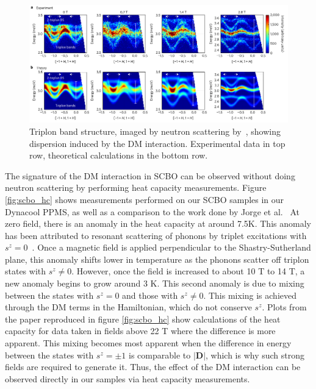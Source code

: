 \documentclass{thesis-umich}
\begin{document}
\begin{figure}
	\centering
	\caption[Triplon Bands in SCBO]{Triplon band structure, imaged by neutron scattering by~\cite{McClarty2017}, showing dispersion induced by the DM interaction. Experimental data in top row, theoretical calculations in the bottom row.}
	\label{fig:scbo_triplon_bands}
	\includegraphics[width=\columnwidth]{figures/SCBO_triplon_bands_McClarty.pdf}
\end{figure}

The signature of the DM interaction in SCBO can be observed without doing neutron scattering by performing heat capacity measurements. Figure \ref{fig:scbo_hc} shows measurements performed on our SCBO samples in our Dynacool PPMS, as well as a comparison to the work done by Jorge et al.~\cite{Jorge2005} At zero field, there is an anomaly in the heat capacity at around 7.5K. This anomaly has been attributed to resonant scattering of phonons by triplet excitations with $s^z = 0$~\cite{Hofmann2001}. Once a magnetic field is applied perpendicular to the Shastry-Sutherland plane, this anomaly shifts lower in temperature as the phonons scatter off triplon states with $s^z \neq 0$. However, once the field is increased to about 10 T to 14 T, a new anomaly begins to grow around 3 K. This second anomaly is due to mixing between the states with $s^z = 0$ and those with $s^z \neq 0$. This mixing is achieved through the DM terms in the Hamiltonian, which do not conserve $s^z$. Plots from the paper reproduced in figure \ref{fig:scbo_hc} show calculations of the heat capacity for data taken in fields above 22 T where the difference is more apparent. This mixing becomes most apparent when the difference in energy between the states with $s^z = \pm 1$ is comparable to $|\mathbf{D}|$, which is why such strong fields are required to generate it. Thus, the effect of the DM interaction can be observed directly in our samples via heat capacity measurements.
\end{document}
